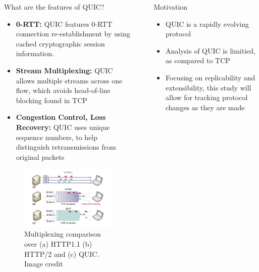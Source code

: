 \documentclass[final]{beamer}
\newlength{\sepwid}
\newlength{\onecolwid}
\begin{document}
\begin{frame}[t]
\begin{columns}[t]
\begin{column}{\onecolwid}
\begin{block}{What are the features of QUIC?}
\begin{itemize}
	\item \textbf{0-RTT:} QUIC features 0-RTT connection re-establishment by using cached cryptographic session information.
	\item \textbf{Stream Multiplexing:} QUIC allows multiple streams across one flow, which avoids head-of-line blocking found in TCP
	\item \textbf{Congestion Control, Loss Recovery:} QUIC uses unique sequence numbers, to help distinguish retransmissions from original packets
\end{itemize}


\begin{figure}
\includegraphics[width=0.8\linewidth]{images/QUICmulti.png}
\caption{Multiplexing comparison over (a) HTTP1.1 (b) HTTP/2 and (c) QUIC. Image credit \cite{7867726}}
\end{figure}

\end{block}

\end{column} %

\begin{column}{\sepwid}\end{column} %

\begin{column}{\onecolwid} %

\begin{block}{Motivation}
\begin{itemize}
	\item QUIC is a rapidly evolving protocol
	\item Analysis of QUIC is limitied, as compared to TCP
	\item Focusing on replicability and extensibility, this study will allow for tracking protocol changes as they are made
\end{itemize}
\end{block}


\end{column}
\end{columns}
\end{frame}
\end{document}
